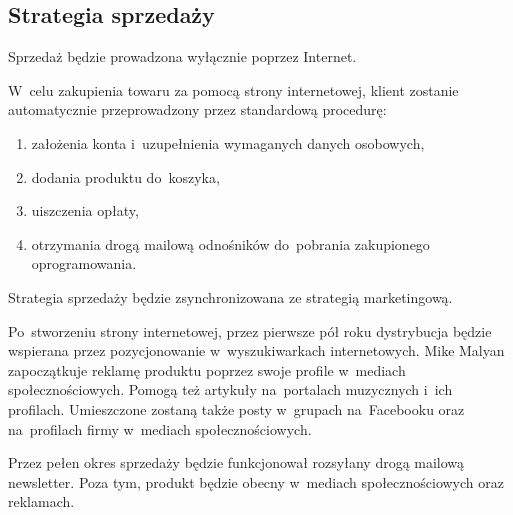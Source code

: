 \documentclass[12pt]{article}
\begin{document}

\subsection{Strategia sprzedaży}


Sprzedaż będzie prowadzona wyłącznie poprzez Internet.

W~celu zakupienia towaru za pomocą strony internetowej, klient zostanie automatycznie przeprowadzony przez standardową procedurę:
\begin{enumerate}
    \item założenia konta i~uzupełnienia wymaganych danych osobowych,
    \item dodania produktu do~koszyka,
    \item uiszczenia opłaty,
    \item otrzymania drogą mailową odnośników do~pobrania zakupionego oprogramowania.
\end{enumerate}

Strategia sprzedaży będzie zsynchronizowana ze strategią marketingową.

Po~stworzeniu strony internetowej, przez pierwsze pół roku dystrybucja będzie wspierana przez pozycjonowanie w~wyszukiwarkach internetowych.
Mike Malyan zapoczątkuje reklamę produktu poprzez swoje profile w~mediach społecznościowych.
Pomogą też artykuły na~portalach muzycznych i~ich profilach.
Umieszczone zostaną także posty w~grupach na~Facebooku oraz na~profilach firmy w~mediach społecznościowych.

Przez pełen okres sprzedaży będzie funkcjonował rozsyłany drogą mailową newsletter.
Poza tym, produkt będzie obecny w~mediach społecznościowych oraz reklamach.
\end{document}
